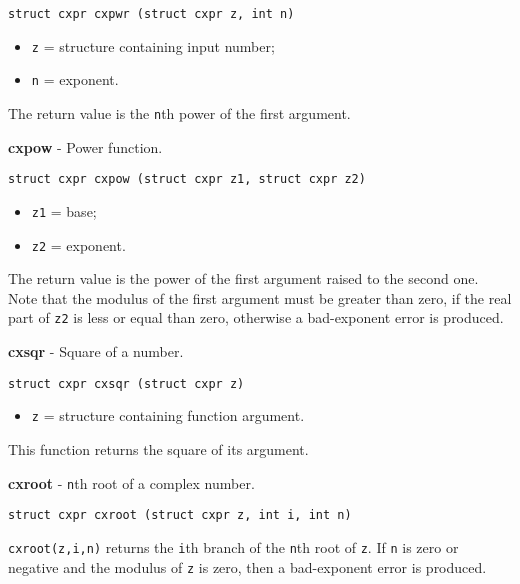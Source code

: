\documentclass{article}
\begin{document}
\begin{verbatim}
struct cxpr cxpwr (struct cxpr z, int n)
\end{verbatim}

\begin{itemize}
\item \texttt{z} = structure containing input number;
\item \texttt{n} = exponent.
\end{itemize}

The return value is the \texttt{n}th power
of the first argument.


\hrulefill{}

\textbf{cxpow} - Power function.

\begin{verbatim}
struct cxpr cxpow (struct cxpr z1, struct cxpr z2)
\end{verbatim}

\begin{itemize}
\item \texttt{z1} = base;
\item \texttt{z2} = exponent.
\end{itemize}

The return value is the power of the first argument
raised to the second one.
Note that the modulus of the first argument must be greater than zero,
if the real part of \texttt{z2} is less or equal than zero,
otherwise a bad-exponent error is produced.


\hrulefill{}

\textbf{cxsqr} - Square of a number.

\begin{verbatim}
struct cxpr cxsqr (struct cxpr z)
\end{verbatim}

\begin{itemize}
\item \texttt{z} = structure containing function argument.
\end{itemize}

This function returns the square of its argument.


\hrulefill{}

\textbf{cxroot} - \texttt{n}th root of a complex number.

\begin{verbatim}
struct cxpr cxroot (struct cxpr z, int i, int n)
\end{verbatim}

\texttt{cxroot(z,i,n)} returns the \texttt{i}th branch of
the \texttt{n}th root of \texttt{z}.
If \texttt{n} is zero or negative and the modulus of \texttt{z} is zero,
then a bad-exponent error is produced.
\end{document}
